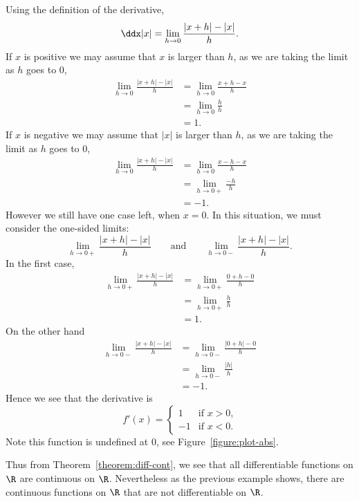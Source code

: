 \begin{solution}
Using the definition of the derivative,
\[
\ddx |x| = \lim_{h\to0}\frac{|x+h| -|x|}{h}.
\]
If $x$ is positive we may assume that $x$ is larger than $h$, as we are
taking the limit as $h$ goes to $0$,
\begin{align*}
\lim_{h\to0}\frac{|x+h| -|x|}{h} &= \lim_{h\to0}\frac{x+h -x}{h}\\
&= \lim_{h\to0}\frac{h}{h}\\
&= 1.
\end{align*}
If $x$ is negative we may assume that $|x|$ is larger than $h$, as we are taking
the limit as $h$ goes to $0$,
\begin{align*}
\lim_{h\to0}\frac{|x+h| -|x|}{h} &= \lim_{h\to0}\frac{x-h -x}{h}\\
&= \lim_{h\to0+}\frac{-h}{h}\\
&= -1.
\end{align*}
However we still have one case left, when $x=0$. In this situation, we
must consider the one-sided limits:
\[
\lim_{h\to0+}\frac{|x+h| -|x|}{h}\qquad\text{and}\qquad \lim_{h\to0-}\frac{|x+h| -|x|}{h}.
\]
In the first case, 
\begin{align*}
\lim_{h\to0+}\frac{|x+h| -|x|}{h} &= \lim_{h\to 0+}\frac{0+h - 0}{h}\\
&= \lim_{h\to 0+}\frac{h}{h}\\
&=1.
\end{align*}
On the other hand
\begin{align*}
\lim_{h\to0-}\frac{|x+h| -|x|}{h} &= \lim_{h\to 0-}\frac{|0+h| - 0}{h}\\
&= \lim_{h\to 0-}\frac{|h|}{h}\\
&=-1.
\end{align*}
Hence we see that the derivative is
\[
f'(x) = 
\begin{cases}
1 &\text{if $x>0$,}\\
-1 &\text{if $x<0$.}
\end{cases}
\]
Note this function is undefined at $0$, see Figure~\ref{figure:plot-abs}. 
\end{solution}


Thus from Theorem~\ref{theorem:diff-cont}, we see that all
differentiable functions on $\R$ are continuous on $\R$. Nevertheless
as the previous example shows, there are continuous functions on $\R$
that are not differentiable on $\R$.



